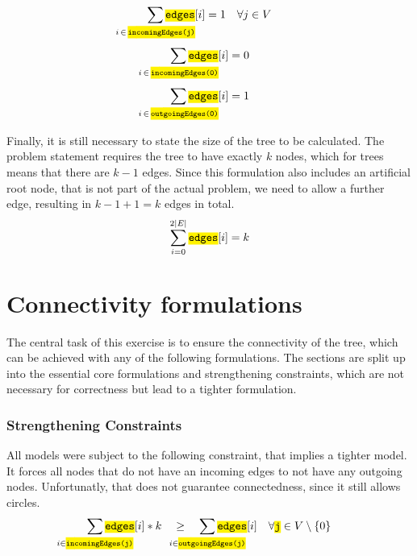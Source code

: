 \documentclass[,%
			paper=a4,%
			DIV14,
			liststotoc,
			bibtotoc,
			draft=false,%
			numbers=noendperiod
			]{scrartcl}
\newcommand{\ilc}[1]{\hl{\texttt{#1}}} %
\begin{document}
\begin{equation}\label{eq:oneIncoming}
	\sum_{\mathclap{i\,\in\,\ilc{incomingEdges(j)}}} \ilc{edges}[i] = 1 \quad \forall j \in V
\end{equation}
\begin{equation}\label{eq:root0}
	\sum_{\mathclap{i\,\in\,\ilc{incomingEdges(0)}}} \ilc{edges}[i] = 0
\end{equation}
\begin{equation}\label{eq:root1}
	\sum_{\mathclap{i\,\in\,\ilc{outgoingEdges(0)}}} \ilc{edges}[i] = 1 
\end{equation}

Finally, it is still necessary to state the size of the tree to be calculated.
The problem statement requires the tree to have exactly $k$ nodes, which for trees means that there are $k-1$ edges.
Since this formulation also includes an artificial root node, that is not part of the actual problem, we need to allow a further edge, resulting in $k-1+1=k$ edges in total.
\begin{equation}
	\sum_{i=0}^{2|E|} \ilc{edges}[i] = k
\end{equation}

\section{Connectivity formulations}

The central task of this exercise is to ensure the connectivity of the tree, which can be achieved with any of the following formulations.
The sections are split up into the essential core formulations and strengthening constraints, which are not necessary for correctness but lead to a tighter formulation.

\subsubsection{Strengthening Constraints}
All models were subject to the following constraint, that implies a tighter model. It forces all nodes that do not have an incoming edges to not have any outgoing nodes. Unfortunatly, that does not guarantee connectedness, since it still allows circles.
\begin{equation}\label{eq:StrAll}
	\sum_{\mathclap{i \in \ilc{incomingEdges(j)}}} \ilc{edges}[i] * k
 \quad \geq \quad
	\sum_{\mathclap{i \in \ilc{outgoingEdges(j)}}} \ilc{edges}[i]
\quad \forall \ilc{j} \in V \setminus \{0\}
\end{equation}
\end{document}
